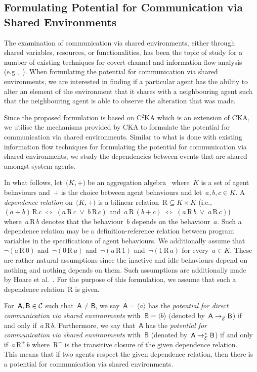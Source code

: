 \documentclass[copyright,creativecommons]{eptcs}
\makeatletter
\newcommand{\eg}{\textrm{e.g.,}\@\xspace}
\newcommand{\ie}{\textrm{i.e.,}\@\xspace}
\newcommand{\etal}{\textrm{et al.}\@\xspace}
\newcommand{\PFC}{potential for communication\@\xspace}
\newcommand{\PFCD}{potential for direct communication\@\xspace}
\newcommand{\C}{{\cal{C}}}
\newcommand{\bigP}[1]{\big( #1 \big)}
\newcommand{\bigA}[1]{\big\langle #1 \big\rangle}
\newcommand{\Not}{\neg}
\newcommand{\Or}{\mathrel{\vee}}
\newcommand{\Ors}{\;\Or\;}
\newcommand{\mIff}{\;\Longleftrightarrow\;}
\newcommand{\STleq}{\subseteq}
\newcommand{\CKAabbrv}{CKA\@\xspace}
\newcommand{\CKAset}{K}
\newcommand{\CCKAabbrv}{C$^2$KA\@\xspace}
\newcommand{\Agent}[1]{\mathsf{#1}}
\newcommand{\agent}[2]{\Agent{#1} = \bigA{#2}}
\newcommand{\comm}[2]{\mathrel{{\to}_{#1}^{#2}}}
\newcommand{\env}{{\cal{E}}}
\newcommand{\ENVcommD}[2]{#1 \comm{\env}{} #2}
\newcommand{\ENVcommN}[3]{#1 \comm{\env}{#3} #2}
\newcommand{\ENVcomm}[2]{\ENVcommN{#1}{#2}{*}}
\newcommand{\depOp}{\mathrm{R}}\newcommand{\depOpTC}{\depOp^{+}}
\newcommand{\dep}[2]{#2 \,\depOp\, #1}
\newcommand{\depTC}[2]{#2 \,\depOpTC\, #1}
\newcommand{\indep}[2]{\Not(#2 \,\depOp\, #1)}
\makeatother
\begin{document}
\subsection{Formulating Potential for Communication via Shared Environments}
\label{sub:potential_for_communication_via_shared_environments}


The examination of communication via shared environments, either through shared variables, resources, or functionalities, has been the topic of study for a number of existing techniques for covert channel and information flow analysis (\eg~\cite{Kemmerer1983aa,Kemmerer1991aa,Sabri2009aa,Shieh1999aa,Wang2005aa}). When formulating the \PFC via shared environments, we are interested in finding if a particular agent has the ability to alter an element of the environment that it shares with a neighbouring agent such that the neighbouring agent is able to observe the alteration that was made.

Since the proposed formulation is based on \CCKAabbrv which is an extension of \CKAabbrv, we utilise the mechanisms provided by \CKAabbrv to formulate the \PFC via shared environments. Similar to what is done with existing information flow techniques for formulating the \PFC via shared environments, we study the dependencies between events that are shared amongst system agents.

In what follows, let~$\bigP{\CKAset, +}$ be an aggregation algebra~\cite{Hoare2009ab,Hoare2010aa,Hoare2011aa} where~$\CKAset$ is a set of agent behaviours and~$+$ is the choice between agent behaviours and let~$a,b,c \in \CKAset$. A \emph{dependence relation} on~$\bigP{\CKAset, +}$ is a bilinear relation~$\depOp \STleq \CKAset \times \CKAset$ (\ie~$\dep{c}{(a + b)} \mIff (\dep{c}{a} \Ors \dep{c}{b})$ and~$\dep{(b + c)}{a} \mIff (\dep{b}{a} \Ors \dep{c}{a})$) where~$\dep{b}{a}$ denotes that the behaviour~$b$ depends on the behaviour~$a$. Such a dependence relation may be a definition-reference relation between program variables in the specifications of agent behaviours. We additionally assume that~$\indep{0}{a}$ and~$\indep{a}{0}$ and~$\indep{1}{a}$ and~$\indep{a}{1}$ for every~$a \in \CKAset$. These are rather natural assumptions since the inactive and idle behaviours depend on nothing and nothing depends on them. Such assumptions are additionally made by Hoare \etal~\cite{Hoare2011aa}. For the purpose of this formulation, we assume that such a dependence relation~$\depOp$ is given.

For~$\Agent{A},\Agent{B} \in \C$ such that~$\Agent{A} \neq \Agent{B}$, we say~$\agent{A}{a}$ has the \emph{\PFCD via shared environments} with~$\agent{B}{b}$ (denoted by~$\ENVcommD{\Agent{A}}{\Agent{B}}$) if and only if~$\dep{b}{a}$. Furthermore, we say that~$\Agent{A}$ has the \emph{\PFC via shared environments} with~$\Agent{B}$ (denoted by~$\ENVcomm{\Agent{A}}{\Agent{B}}$) if and only if~$\depTC{b}{a}$ where~$\depOpTC$ is the transitive closure of the given dependence relation. This means that if two agents respect the given dependence relation, then there is a \PFC via shared environments. 
\end{document}
